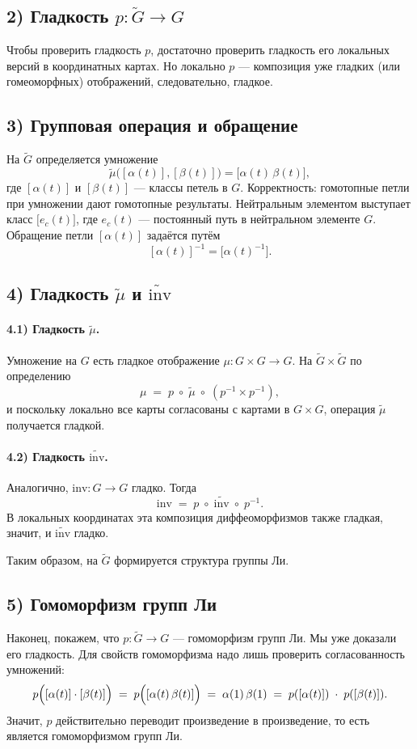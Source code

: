 \documentclass{article}
\begin{document}
\subsection*{2) Гладкость $p \colon \widetilde{G} \to G$}
Чтобы проверить гладкость $p$, достаточно проверить гладкость его локальных версий в координатных картах. Но локально $p$ --- композиция уже гладких (или гомеоморфных) отображений, следовательно, гладкое.

\subsection*{3) Групповая операция и обращение}
На $\widetilde{G}$ определяется умножение
\[
\widetilde{\mu}\bigl([\alpha(t)], [\beta(t)]\bigr) = \bigl[\alpha(t)\,\beta(t)\bigr],
\]
где $[\alpha(t)]$ и $[\beta(t)]$ --- классы петель в $G$. Корректность: гомотопные петли при умножении дают гомотопные результаты. Нейтральным элементом выступает класс $\bigl[e_c(t)\bigr]$, где $e_c(t)$ --- постоянный путь в нейтральном элементе $G$. Обращение петли $[\alpha(t)]$ задаётся путём
\[
[\alpha(t)]^{-1} = \bigl[\alpha(t)^{-1}\bigr].
\]

\subsection*{4) Гладкость $\widetilde{\mu}$ и $\widetilde{\mathrm{inv}}$}
\paragraph{4.1) Гладкость $\widetilde{\mu}$.}
Умножение на $G$ есть гладкое отображение $\mu \colon G \times G \to G$. На $\widetilde{G} \times \widetilde{G}$ по определению
\[
\mu \;=\; p \;\circ\; \widetilde{\mu}\;\circ\;(p^{-1} \times p^{-1}),
\]
и поскольку локально все карты согласованы с картами в $G \times G$, операция $\widetilde{\mu}$ получается гладкой.

\paragraph{4.2) Гладкость $\widetilde{\mathrm{inv}}$.}
Аналогично, $\mathrm{inv} \colon G \to G$ гладко. Тогда
\[
\mathrm{inv} \;=\; p \;\circ\; \widetilde{\mathrm{inv}} \;\circ\; p^{-1}.
\]
В локальных координатах эта композиция диффеоморфизмов также гладкая, значит, и $\widetilde{\mathrm{inv}}$ гладко.

Таким образом, на $\widetilde{G}$ формируется структура группы Ли.

\subsection*{5) Гомоморфизм групп Ли}
Наконец, покажем, что $p \colon \widetilde{G} \to G$ --- гомоморфизм групп Ли. Мы уже доказали его гладкость. Для свойств гомоморфизма надо лишь проверить согласованность умножений:
\[
p\Bigl([\alpha(t)] \cdot [\beta(t)]\Bigr) \;=\; p\Bigl([\alpha(t)\,\beta(t)]\Bigr)
\;=\; \alpha(1)\,\beta(1)
\;=\; p([\alpha(t)])\;\cdot\;p([\beta(t)]).
\]
Значит, $p$ действительно переводит произведение в произведение, то есть является гомоморфизмом групп Ли.
\end{document}
